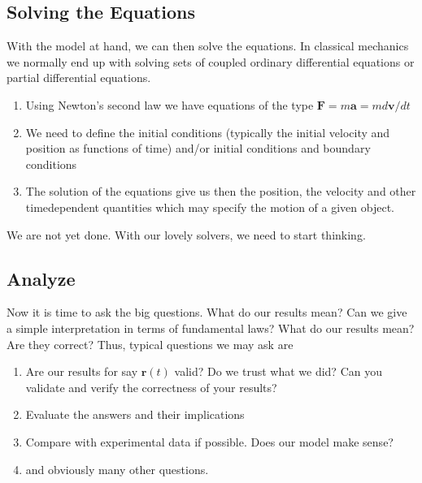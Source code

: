 \documentclass[letterpaper,10pt,english]{sphinxmanual}
\begin{document}
\subsection{Solving the Equations}
\label{\detokenize{chapter2:solving-the-equations}}
With the model at hand, we can then solve the equations. In classical mechanics we normally end up  with solving sets of coupled ordinary differential equations or partial differential equations.
\begin{enumerate}
%
\item {} 
Using Newton’s second law we have equations of the type \(\boldsymbol{F}=m\boldsymbol{a}=md\boldsymbol{v}/dt\)

\item {} 
We need to  define the initial conditions (typically the initial velocity and position as functions of time) and/or initial conditions and boundary conditions

\item {} 
The solution of the equations give us then the position, the velocity and other time\sphinxhyphen{}dependent quantities which may specify the motion of a given object.

\end{enumerate}

We are not yet done. With our lovely solvers, we need to start thinking.


\subsection{Analyze}
\label{\detokenize{chapter2:analyze}}
Now it is time to ask the big questions. What do our results mean? Can we give a simple interpretation in terms of fundamental laws?  What do our results mean? Are they correct?
Thus, typical questions we may ask are
\begin{enumerate}
%
\item {} 
Are our results for say \(\boldsymbol{r}(t)\) valid?  Do we trust what we did?  Can you validate and verify the correctness of your results?

\item {} 
Evaluate the answers and their implications

\item {} 
Compare with experimental data if possible. Does our model make sense?

\item {} 
and obviously many other questions.

\end{enumerate}
\end{document}
